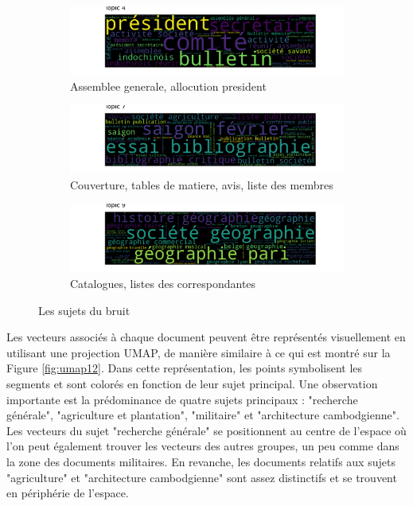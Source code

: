 \begin{figure}[H]
     \centering
     \begin{subfigure}[b]{0.9\textwidth}
         \centering
         \includegraphics[width=\textwidth]{img/wordcloud model ngram 200 topic 4 .png}
         \caption{Assemblee generale, allocution president}
         \label{fig:tp12_4}
     \end{subfigure}
     \hfill
     \begin{subfigure}[b]{0.9\textwidth}
         \centering
         \includegraphics[width=\textwidth]{img/wordcloud model ngram 200 topic 7 .png}
         \caption{Couverture, tables de matiere, avis, liste des membres}
         \label{fig:tp12_7}
     \end{subfigure}
     \hfill
     \begin{subfigure}[b]{0.9\textwidth}
         \centering
         \includegraphics[width=\textwidth]{img/wordcloud model ngram 200 topic 9 .png}
         \caption{Catalogues, listes des correspondantes}
         \label{fig:tp12_9}
     \end{subfigure}
        \caption{Les sujets du bruit}
        \label{fig:noise_topic}
\end{figure}

Les vecteurs associés à chaque document peuvent être représentés visuellement en utilisant une projection UMAP, de manière similaire à ce qui est montré sur la Figure \ref{fig:umap12}. Dans cette représentation, les points symbolisent les segments et sont colorés en fonction de leur sujet principal. Une observation importante est la prédominance de quatre sujets principaux : "recherche générale", "agriculture et plantation", "militaire" et "architecture cambodgienne". Les vecteurs du sujet "recherche générale" se positionnent au centre de l'espace où l'on peut également trouver les vecteurs des autres groupes, un peu comme dans la zone des documents militaires. En revanche, les documents relatifs aux sujets "agriculture" et "architecture cambodgienne" sont assez distinctifs et se trouvent en périphérie de l'espace.

